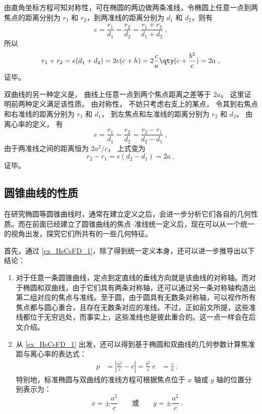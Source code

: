 由直角坐标方程可知对称性，可在椭圆的两边做两条准线，令椭圆上任意一点到两焦点的距离分别为 $r_1$ 和 $r_2$，到两准线的距离分别为 $d_1$ 和 $d_2$，则有
\begin{equation}
e = \frac{r_1}{d_1} = \frac{r_2}{d_2} = \frac{r_1 + r_2}{d_1 + d_2}~,
\end{equation}
所以
\begin{equation}
r_1 + r_2 = e(d_1+d_2) = 2e(c + h) = 2\frac{c}{a} \qty( c + \frac{b^2}{c} ) = 2a~,
\end{equation}
证毕。

双曲线的另一种定义是， 曲线上任意一点到两个焦点距离之差等于 $2a$。 这里证明前两种定义满足该性质。 由对称性， 不妨只考虑右支上的某点， 令其到右焦点和右准线的距离分别为 $r_1$ 和 $d_1$， 到左焦点和左准线的距离分别为 $r_2$ 和 $d_2$。 由离心率的定义， 有
\begin{equation}
e = \frac{r_1}{d_1} = \frac{r_2}{d_2} = \frac{r_2 - r_1}{d_2 - d_1}~,
\end{equation}
由于两准线之间的距离恒为 $2a^2/c$， 上式变为
\begin{equation}
r_2 - r_1 = e(d_2 - d_1) = 2a~,
\end{equation}
证毕。


\subsection{圆锥曲线的性质}

在研究椭圆等圆锥曲线时，通常在建立定义之后，会进一步分析它们各自的几何性质。而在前面已经建立了圆锥曲线的焦点–准线统一定义后，现在可以从一个统一的视角出发，探究它们所共有的一些几何特征。

首先，通过 \autoref{ex_HsCsFD_1}，除了得到统一定义本身，还可以进一步推导出以下结论：
\begin{enumerate}
\item 对于任意一条圆锥曲线，定点到定直线的垂线方向就是该曲线的对称轴。而对于椭圆和双曲线，由于它们具有两条对称轴，还可以通过另一条对称轴构造出第二组对应的焦点与准线。至于圆，由于圆具有无数条对称轴，可以视作所有焦点都与圆心重合，且存在无数条对应的准线。不过，正如前文所提，这些准线都位于无穷远处，而事实上，这些准线也是彼此重合的。这一点一样会在后文介绍。
\item 从 \autoref{ex_HsCsFD_1} 出发，还可以得到基于椭圆和双曲线的几何参数计算焦准距与离心率的表达式：
\begin{equation}
\begin{split}
p &= \left| \frac{a^2}{c} - c \right| = \frac{b^2}{c}\
e &= \frac{c}{a}~.
\end{split}
\end{equation}
特别地，标准椭圆与双曲线的准线方程可根据焦点位于 $x$ 轴或 $y$ 轴的位置分别表示为：
\begin{equation}
x = \pm\frac{a^2}{c} \qquad \text{或} \qquad y = \pm\frac{a^2}{c}~.
\end{equation}
\end{enumerate}

